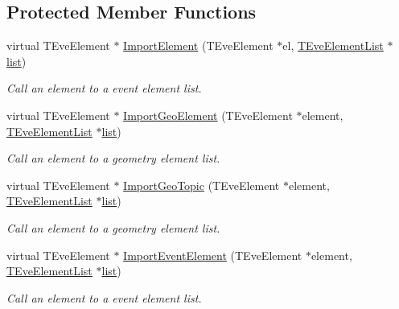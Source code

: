 \subsection*{Protected Member Functions}
\begin{DoxyCompactItemize}
\item 
virtual TEveElement $\ast$ \hyperlink{class_d_d4hep_1_1_projection_ad68a569fdc412f5ed8769e89df3dd821}{ImportElement} (TEveElement $\ast$el, \hyperlink{class_t_eve_element_list}{TEveElementList} $\ast$\hyperlink{classstd_1_1list}{list})
\begin{DoxyCompactList}\small\item\em Call an element to a event element list. \item\end{DoxyCompactList}\item 
virtual TEveElement $\ast$ \hyperlink{class_d_d4hep_1_1_projection_a05c32084a42c00a366077acec5a55a82}{ImportGeoElement} (TEveElement $\ast$element, \hyperlink{class_t_eve_element_list}{TEveElementList} $\ast$\hyperlink{classstd_1_1list}{list})
\begin{DoxyCompactList}\small\item\em Call an element to a geometry element list. \item\end{DoxyCompactList}\item 
virtual TEveElement $\ast$ \hyperlink{class_d_d4hep_1_1_projection_a97415addc63b3253bbccc3bcd0414c26}{ImportGeoTopic} (TEveElement $\ast$element, \hyperlink{class_t_eve_element_list}{TEveElementList} $\ast$\hyperlink{classstd_1_1list}{list})
\begin{DoxyCompactList}\small\item\em Call an element to a geometry element list. \item\end{DoxyCompactList}\item 
virtual TEveElement $\ast$ \hyperlink{class_d_d4hep_1_1_projection_a63d20236b4b67710dcfb9904848465aa}{ImportEventElement} (TEveElement $\ast$element, \hyperlink{class_t_eve_element_list}{TEveElementList} $\ast$\hyperlink{classstd_1_1list}{list})
\begin{DoxyCompactList}\small\item\em Call an element to a event element list. \item\end{DoxyCompactList}\end{DoxyCompactItemize}
